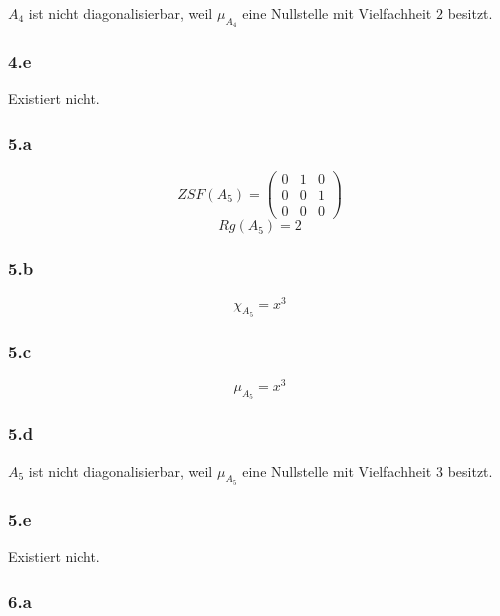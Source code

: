 \documentclass[10pt,a4paper]{article}
\begin{document}
$A_{4}$ ist nicht diagonalisierbar, weil $\mu_{A_{4}}$ eine Nullstelle mit Vielfachheit $2$ besitzt.

\subsubsection*{4.e}

Existiert nicht.

\subsubsection*{5.a}

\begin{equation}
ZSF(A_{5}) = 
\begin{pmatrix}
0 & 1 & 0\\
0 & 0 & 1\\
0 & 0 & 0
\end{pmatrix}
\end{equation}
\begin{equation}
Rg(A_{5}) = 2
\end{equation}

\subsubsection*{5.b}

\begin{equation}
\chi_{A_{5}} = x^{3}
\end{equation}

\subsubsection*{5.c}

\begin{equation}
\mu_{A_{5}} = x^{3}
\end{equation}

\subsubsection*{5.d}

$A_{5}$ ist nicht diagonalisierbar, weil $\mu_{A_{5}}$ eine Nullstelle mit Vielfachheit $3$ besitzt.

\subsubsection*{5.e}

Existiert nicht.

\subsubsection*{6.a}
\end{document}
